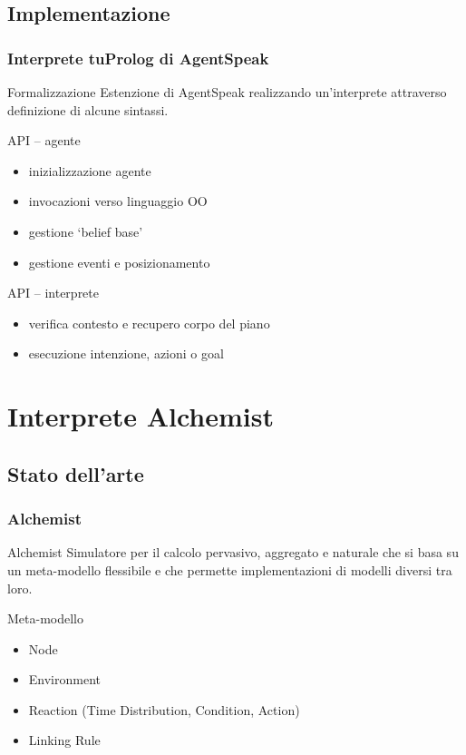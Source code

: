 \documentclass[handout]{beamer}\mode<presentation>{\usetheme{AMSCesenaBleu}}
\begin{document}
\subsection{Implementazione}

\begin{frame}
\frametitle{Interprete tuProlog di AgentSpeak}
\begin{block}{Formalizzazione}
Estenzione di AgentSpeak realizzando un'interprete attraverso definizione di alcune sintassi.
\end{block}

\begin{block}{API -- agente}
\begin{itemize}
\item inizializzazione agente
\item invocazioni verso linguaggio OO
\item gestione `belief base'
\item gestione eventi e posizionamento
\end{itemize}
\end{block}

\begin{block}{API -- interprete}
\begin{itemize}
\item verifica contesto e recupero corpo del piano
\item esecuzione intenzione, azioni o goal
\end{itemize}
\end{block}
\end{frame}



\section{Interprete Alchemist}

\subsection{Stato dell'arte}

\begin{frame}
\frametitle{Alchemist}
\begin{block}{Alchemist}
Simulatore per il calcolo pervasivo, aggregato e naturale che si basa su un meta-modello flessibile e che permette implementazioni di modelli diversi tra loro.
\end{block}
\begin{block}{Meta-modello}
\begin{itemize}
\item Node
\item Environment
\item Reaction (Time Distribution, Condition, Action)
\item Linking Rule
\end{itemize}
\end{block}
\end{frame}
\end{document}
